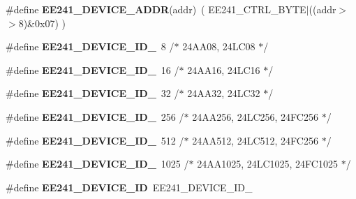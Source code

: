 \begin{DoxyCompactItemize}
\item 
\hypertarget{group___e_e241__module_gac7ed2f4a4c0f7fa0707be1c7bbaca3fa}{\#define {\bfseries E\-E241\-\_\-\-D\-E\-V\-I\-C\-E\-\_\-\-A\-D\-D\-R}(addr)~( E\-E241\-\_\-\-C\-T\-R\-L\-\_\-\-B\-Y\-T\-E$|$((addr$>$$>$8)\&0x07) )}\label{group___e_e241__module_gac7ed2f4a4c0f7fa0707be1c7bbaca3fa}

\item 
\hypertarget{group___e_e241__module_ga7e5bfbb84fb492a939a407eddb39cdaa}{\#define {\bfseries E\-E241\-\_\-\-D\-E\-V\-I\-C\-E\-\_\-\-I\-D\-\_}~8 /$\ast$ 24\-A\-A08, 24\-L\-C08 $\ast$/}\label{group___e_e241__module_ga7e5bfbb84fb492a939a407eddb39cdaa}

\item 
\hypertarget{group___e_e241__module_ga07965930260e61a4eac28ead460d4f3d}{\#define {\bfseries E\-E241\-\_\-\-D\-E\-V\-I\-C\-E\-\_\-\-I\-D\-\_}~16 /$\ast$ 24\-A\-A16, 24\-L\-C16 $\ast$/}\label{group___e_e241__module_ga07965930260e61a4eac28ead460d4f3d}

\item 
\hypertarget{group___e_e241__module_ga8d27950246347a4badf56e8e51900105}{\#define {\bfseries E\-E241\-\_\-\-D\-E\-V\-I\-C\-E\-\_\-\-I\-D\-\_}~32 /$\ast$ 24\-A\-A32, 24\-L\-C32 $\ast$/}\label{group___e_e241__module_ga8d27950246347a4badf56e8e51900105}

\item 
\hypertarget{group___e_e241__module_gaf49a4e66d72089c6c66357696b4fca15}{\#define {\bfseries E\-E241\-\_\-\-D\-E\-V\-I\-C\-E\-\_\-\-I\-D\-\_}~256 /$\ast$ 24\-A\-A256, 24\-L\-C256, 24\-F\-C256 $\ast$/}\label{group___e_e241__module_gaf49a4e66d72089c6c66357696b4fca15}

\item 
\hypertarget{group___e_e241__module_ga0389b2518ef4d6ff75549684b75a8719}{\#define {\bfseries E\-E241\-\_\-\-D\-E\-V\-I\-C\-E\-\_\-\-I\-D\-\_}~512 /$\ast$ 24\-A\-A512, 24\-L\-C512, 24\-F\-C256 $\ast$/}\label{group___e_e241__module_ga0389b2518ef4d6ff75549684b75a8719}

\item 
\hypertarget{group___e_e241__module_ga9b1073633e053e30ff0117b7dfbff883}{\#define {\bfseries E\-E241\-\_\-\-D\-E\-V\-I\-C\-E\-\_\-\-I\-D\-\_}~1025 /$\ast$ 24\-A\-A1025, 24\-L\-C1025, 24\-F\-C1025 $\ast$/}\label{group___e_e241__module_ga9b1073633e053e30ff0117b7dfbff883}

\item 
\hypertarget{group___e_e241__module_ga9f3066f5fad43b538c5ef6aa8ae8f8ef}{\#define {\bfseries E\-E241\-\_\-\-D\-E\-V\-I\-C\-E\-\_\-\-I\-D}~E\-E241\-\_\-\-D\-E\-V\-I\-C\-E\-\_\-\-I\-D\-\_}\label{group___e_e241__module_ga9f3066f5fad43b538c5ef6aa8ae8f8ef}


\end{DoxyCompactItemize}
